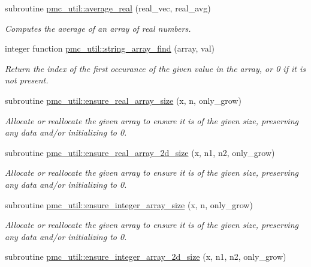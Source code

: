 \begin{DoxyCompactItemize}
subroutine \mbox{\hyperlink{namespacepmc__util_a5659f4d2fd9c274756e737639dc30196}{pmc\+\_\+util\+::average\+\_\+real}} (real\+\_\+vec, real\+\_\+avg)
\begin{DoxyCompactList}\small\item\em Computes the average of an array of real numbers. \end{DoxyCompactList}\item 
integer function \mbox{\hyperlink{namespacepmc__util_a20346c4da2a25e5b8a3215240e851e5f}{pmc\+\_\+util\+::string\+\_\+array\+\_\+find}} (array, val)
\begin{DoxyCompactList}\small\item\em Return the index of the first occurance of the given value in the array, or 0 if it is not present. \end{DoxyCompactList}\item 
subroutine \mbox{\hyperlink{namespacepmc__util_ad5e823b848ba95bfd29d67f1cfee7a7a}{pmc\+\_\+util\+::ensure\+\_\+real\+\_\+array\+\_\+size}} (x, n, only\+\_\+grow)
\begin{DoxyCompactList}\small\item\em Allocate or reallocate the given array to ensure it is of the given size, preserving any data and/or initializing to 0. \end{DoxyCompactList}\item 
subroutine \mbox{\hyperlink{namespacepmc__util_a26a0550006c522169b83c4f9c9df69d1}{pmc\+\_\+util\+::ensure\+\_\+real\+\_\+array\+\_\+2d\+\_\+size}} (x, n1, n2, only\+\_\+grow)
\begin{DoxyCompactList}\small\item\em Allocate or reallocate the given array to ensure it is of the given size, preserving any data and/or initializing to 0. \end{DoxyCompactList}\item 
subroutine \mbox{\hyperlink{namespacepmc__util_adbf9a41092ec1df9139a6f149b644102}{pmc\+\_\+util\+::ensure\+\_\+integer\+\_\+array\+\_\+size}} (x, n, only\+\_\+grow)
\begin{DoxyCompactList}\small\item\em Allocate or reallocate the given array to ensure it is of the given size, preserving any data and/or initializing to 0. \end{DoxyCompactList}\item 
subroutine \mbox{\hyperlink{namespacepmc__util_a0cf0527cde4f90e88c216b51686de71d}{pmc\+\_\+util\+::ensure\+\_\+integer\+\_\+array\+\_\+2d\+\_\+size}} (x, n1, n2, only\+\_\+grow)

\end{DoxyCompactItemize}
